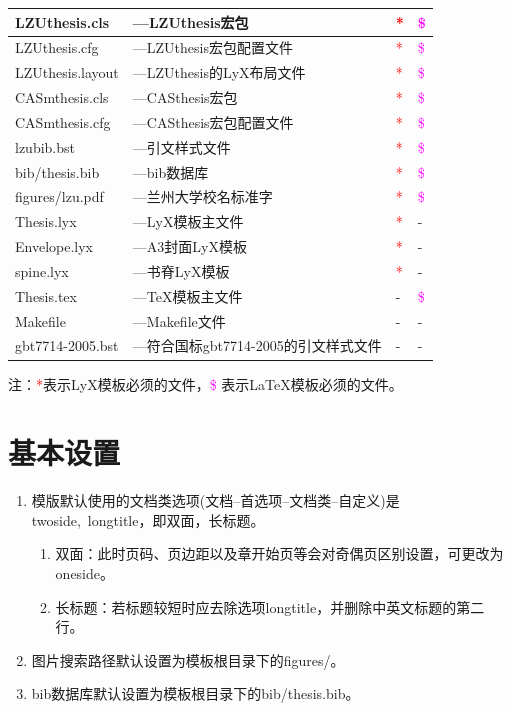 \documentclass[twoside,longtitle]{LZUthesis}
\begin{document}
\begin{tabular}{|l|l|l|l|}
\hline
LZUthesis.cls & ---LZUthesis宏包 & \textcolor{red}{{*}} & \textcolor{magenta}{\$}\tabularnewline
\hline
LZUthesis.cfg & ---LZUthesis宏包配置文件 & \textcolor{red}{{*}} & \textcolor{magenta}{\$}\\
\hline
LZUthesis.layout & ---LZUthesis的LyX布局文件 & \textcolor{red}{{*}} & \textcolor{magenta}{\$}\\
\hline
CASmthesis.cls & ---CASthesis宏包 & \textcolor{red}{{*}} & \textcolor{magenta}{\$}\\
\hline
CASmthesis.cfg & ---CASthesis宏包配置文件 & \textcolor{red}{{*}} & \textcolor{magenta}{\$}\\
\hline
lzubib.bst & ---引文样式文件 & \textcolor{red}{{*}} & \textcolor{magenta}{\$}\\
\hline
bib/thesis.bib & ---bib数据库 & \textcolor{red}{{*}} & \textcolor{magenta}{\$}\\
\hline
figures/lzu.pdf & ---兰州大学校名标准字 & \textcolor{red}{{*}} & \textcolor{magenta}{\$}\\
\hline
Thesis.lyx & ---LyX模板主文件 & \textcolor{red}{{*}} & -\\
\hline
Envelope.lyx & ---A3封面LyX模板 & \textcolor{red}{{*}} & -\\
\hline
spine.lyx & ---书脊LyX模板 & \textcolor{red}{{*}} & -\\
\hline
Thesis.tex & ---\TeX{}模板主文件 & - & \textcolor{magenta}{\$}\\
\hline
Makefile & ---Makefile文件 & - & -\\
\hline
gbt7714-2005.bst & ---符合国标gbt7714-2005的引文样式文件 & - & -\\
\hline
\end{tabular}

注：\textcolor{red}{{*}}表示LyX模板必须的文件，\textcolor{magenta}{\$} 表示\LaTeX{}模板必须的文件。


\section{基本设置}
\begin{enumerate}
\item 模版默认使用的文档类选项(文档--首选项--文档类--自定义)是twoside,~longtitle，即双面，长标题。

\begin{enumerate}
\item 双面：此时页码、页边距以及章开始页等会对奇偶页区别设置，可更改为oneside。
\item 长标题：若标题较短时应去除选项longtitle，并删除中英文标题的第二行。
\end{enumerate}
\item 图片搜索路径默认设置为模板根目录下的figures/。
\item bib数据库默认设置为模板根目录下的bib/thesis.bib。
\end{enumerate}
\end{document}

